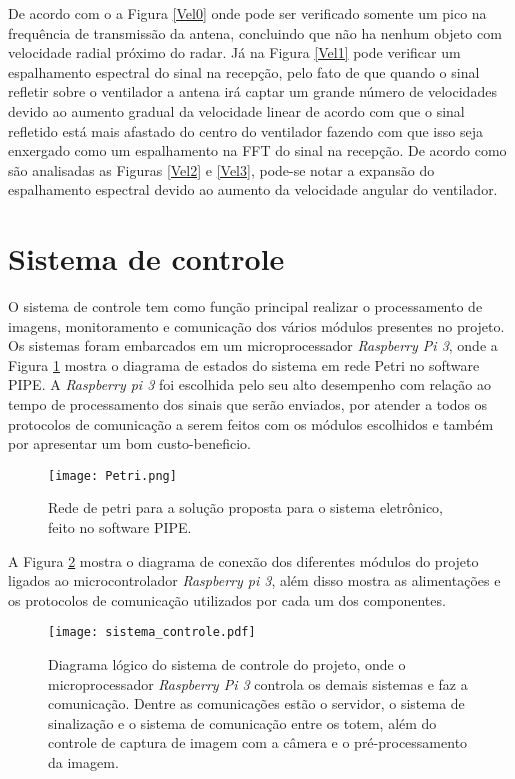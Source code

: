 De acordo com o a Figura \ref{Vel0} onde pode ser verificado somente um pico na frequência de transmissão da antena, concluindo que não ha nenhum objeto com velocidade radial próximo do radar. Já na Figura \ref{Vel1} pode verificar um espalhamento espectral do sinal na recepção, pelo fato de que quando o sinal refletir sobre o ventilador a antena irá captar um grande número de velocidades devido ao aumento gradual da velocidade linear de acordo com que o sinal refletido está mais afastado do centro do ventilador fazendo com que isso seja enxergado como um espalhamento na FFT do sinal na recepção. De acordo como são analisadas as Figuras \ref{Vel2} e \ref{Vel3}, pode-se notar a expansão do espalhamento espectral devido ao aumento da velocidade angular do ventilador.


        
\section{Sistema de controle}

O sistema de controle tem como função principal realizar o processamento de imagens, monitoramento e comunicação dos vários módulos presentes no projeto. Os sistemas foram embarcados em um microprocessador \emph{Raspberry Pi 3}, onde a Figura \ref{redepetri} mostra o diagrama de estados do sistema em rede Petri no software PIPE. A \emph{Raspberry pi 3} foi escolhida pelo seu alto desempenho com relação ao tempo de processamento dos sinais que serão enviados, por atender a todos os protocolos de comunicação a serem feitos com os módulos escolhidos e também por apresentar um bom custo-beneficio.

\begin{figure}[H]
    \centering
    \texttt{[image: Petri.png]}
    \caption{Rede de petri para a solução proposta para o sistema eletrônico, feito no software PIPE.}
    \label{redepetri}
\end{figure}

A Figura \ref{comunicacao} mostra o diagrama de conexão dos diferentes módulos do projeto ligados ao microcontrolador \emph{Raspberry pi 3}, além disso mostra as alimentações e os protocolos de comunicação utilizados por cada um dos componentes.

     \begin{figure}[H]
    \centering
   \texttt{[image: sistema\_controle.pdf]}
   \caption{Diagrama lógico do sistema de controle do projeto, onde o microprocessador \emph{Raspberry Pi 3} controla os demais sistemas e faz a comunicação. Dentre as comunicações estão o servidor, o sistema de sinalização e o sistema de comunicação entre os totem, além do controle de captura de imagem com a câmera e o pré-processamento da imagem.}
   \label{comunicacao}
    \end{figure}
    
